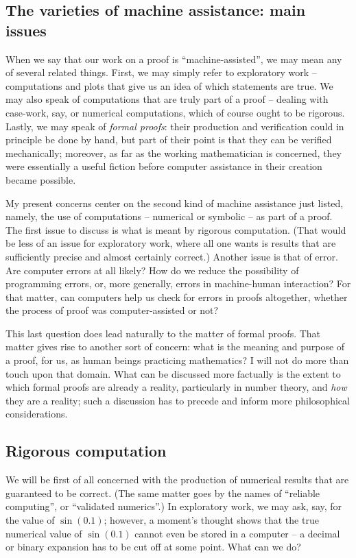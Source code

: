 \subsection{The varieties of machine assistance: main issues}

When we say that our work on a proof is ``machine-assisted'', we may
mean any of several related things. First, we may simply refer to exploratory
work -- computations and plots that give us an idea of which statements are
true. We may also speak of computations that are truly part of a proof --
dealing with case-work, say, or numerical computations, which of course ought
to be rigorous. Lastly, we may speak of {\em formal proofs}: their production
and verification could in principle be done by hand, but part of their point
is that they can be verified mechanically; moreover,
as far as the working mathematician is concerned, they were essentially a
useful fiction before computer assistance in their creation became possible.

My present concerns center on the second kind of machine assistance just listed,
namely, the use of computations -- numerical or symbolic -- as part of a proof. 
The first issue to discuss is what is meant by rigorous computation. (That
would be less of an issue for exploratory work, where all one wants is results
that are sufficiently precise and almost certainly correct.) Another issue
is that of error. Are computer errors at all likely? How do we reduce the
possibility of programming errors, or, more generally, errors in machine-human
interaction? For that matter, can computers help us check for errors in proofs
altogether, whether the process of proof was computer-assisted or not?

This last question does lead naturally to the matter of formal proofs. That
matter gives rise to another sort of concern: what is the meaning
and purpose of a proof, for us, as human beings practicing mathematics? I will
not do more than touch upon
that domain. What can be discussed more factually is the
extent to which formal proofs are already a reality, particularly in number
theory, and {\em how} they are a reality; such a discussion has to precede
and inform more philosophical considerations.

\subsection{Rigorous computation}

We will be first of all
concerned with the production of numerical results that are
guaranteed to be correct. (The same matter goes by the names of
``reliable computing'', or ``validated numerics''.)
In exploratory work, we may ask, say, for the value of $\sin(0.1)$; however,
a moment's thought shows that the true
numerical value of $\sin(0.1)$ cannot even be stored in a computer --
a decimal or binary expansion has to be cut off at some point. What can
we do?


